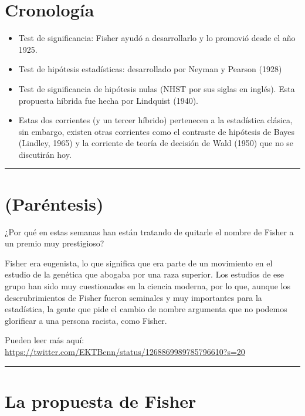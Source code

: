 \documentclass[
]{article}
\begin{document}
\hypertarget{cronologuxeda}{%
\section{Cronología}\label{cronologuxeda}}

\begin{itemize}
\item
  Test de significancia: Fisher ayudó a desarrollarlo y lo promovió
  desde el año 1925.
\item
  Test de hipótesis estadísticas: desarrollado por Neyman y Pearson
  (1928)
\item
  Test de significancia de hipótesis nulas (NHST por sus siglas en
  inglés). Esta propuesta híbrida fue hecha por Lindquist (1940).
\item
  Estas dos corrientes (y un tercer híbrido) pertenecen a la estadística
  clásica, sin embargo, existen otras corrientes como el contraste de
  hipótesis de Bayes (Lindley, 1965) y la corriente de teoría de
  decisión de Wald (1950) que no se discutirán hoy.
\end{itemize}

\begin{center}\rule{0.5\linewidth}{0.5pt}\end{center}

\hypertarget{paruxe9ntesis}{%
\section{(Paréntesis)}\label{paruxe9ntesis}}

¿Por qué en estas semanas han están tratando de quitarle el nombre de
Fisher a un premio muy prestigioso?

Fisher era eugenista, lo que significa que era parte de un movimiento en
el estudio de la genética que abogaba por una raza superior. Los
estudios de ese grupo han sido muy cuestionados en la ciencia moderna,
por lo que, aunque los descrubrimientos de Fisher fueron seminales y muy
importantes para la estadística, la gente que pide el cambio de nombre
argumenta que no podemos glorificar a una persona racista, como Fisher.

Pueden leer más aquí:
\url{https://twitter.com/EKTBenn/status/1268869989785796610?s=20}

\begin{center}\rule{0.5\linewidth}{0.5pt}\end{center}

\hypertarget{la-propuesta-de-fisher}{%
\section{La propuesta de Fisher}\label{la-propuesta-de-fisher}}
\end{document}
